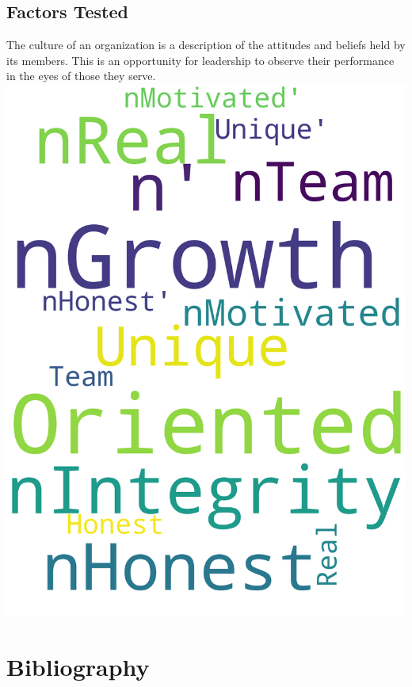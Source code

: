 \documentclass[14pt]{extreport}
\begin{document}
\subsection*{\centering Factors Tested}
The culture of an organization is a description of the attitudes
and beliefs held by its members. This is an opportunity for
leadership to observe their performance in the eyes of those
they serve.
\newpage
\includegraphics[width=.95\linewidth]{q6}

\newpage

\section*{Bibliography}
\end{document}
